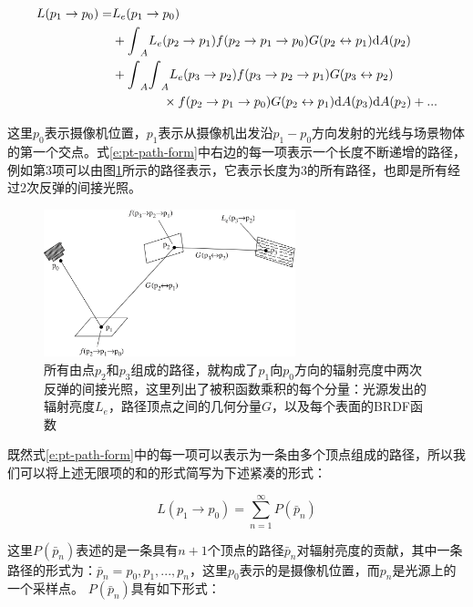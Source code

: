 \begin{equation}
	\begin{aligned}
		L(p_1\to p_0)=&L_e(p_1\to p_0)\\
		&+{\rm \int}_AL_e(p_2\to p_1)f(p_2\to p_1\to p_0)G(p_2\leftrightarrow p_1){\rm d}A(p_2)\\
		&+{\rm \int}_A{\rm \int}_A L_e(p_3\to p_2)f(p_3\to p_2\to p_1)G(p_3\leftrightarrow p_2)\\
		&\qquad\qquad \times f(p_2\to p_1\to p_0)G(p_2\leftrightarrow p_1){\rm d}A(p_3){\rm d}A(p_2)+...
	\end{aligned}
	\label{e:pt-path-form}
\end{equation}

\noindent 这里$p_0$表示摄像机位置，$p_1$表示从摄像机出发沿$p_1-p_0$方向发射的光线与场景物体的第一个交点。式\ref{e:pt-path-form}中右边的每一项表示一个长度不断递增的路径，例如第3项可以由图\ref{f:pt-a-path}所示的路径表示，它表示长度为3的所有路径，也即是所有经过2次反弹的间接光照。

\begin{figure}
\sidecaption
	\includegraphics[width=0.65\textwidth]{figures/pt/path-5}
	\caption{所有由点$p_2$和$p_3$组成的路径，就构成了$p_1$向$p_0$方向的辐射亮度中两次反弹的间接光照，这里列出了被积函数乘积的每个分量：光源发出的辐射亮度$L_e$，路径顶点之间的几何分量$G$，以及每个表面的BRDF函数}
	\label{f:pt-a-path}
\end{figure}

既然式\ref{e:pt-path-form}中的每一项可以表示为一条由多个顶点组成的路径，所以我们可以将上述无限项的和的形式简写为下述紧凑的形式：

\begin{equation}\label{e:path-form}
	L(p_1\to p_0)=\sum_{n=1}^{\infty}P(\bar{p}_n)
\end{equation}

\noindent 这里$P(\bar{p}_n)$表述的是一条具有$n+1$个顶点的路径$\bar{p}_n$对辐射亮度的贡献，其中一条路径的形式为：$\bar{p}_n=p_0,p_1,...,p_n$，这里$p_0$表示的是摄像机位置，而$p_n$是光源上的一个采样点。 $P(\bar{p}_n)$具有如下形式：

